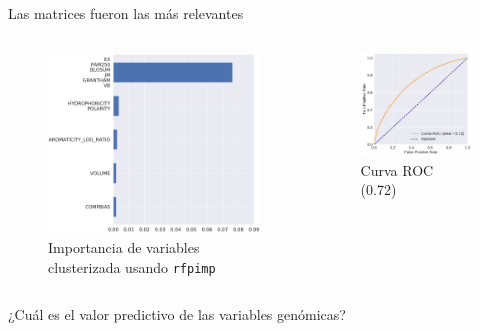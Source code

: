 \documentclass[
  spanish,
  ignorenonframetext,
]{beamer}
\begin{document}
\begin{frame}{Las matrices fueron las más relevantes}
\protect\hypertarget{las-matrices-fueron-las-muxe1s-relevantes}{}

\begin{columns}[T]
\begin{column}{0.48\textwidth}
\begin{figure}
\centering
\includegraphics[width=2.39583in,height=\textheight]{structural_importance_cluster.pdf}
\caption{Importancia de variables clusterizada usando \texttt{rfpimp}}
\end{figure}
\end{column}

\begin{column}{0.48\textwidth}
\begin{figure}
\centering
\includegraphics[width=1.92708in,height=\textheight]{auc_structural.pdf}
\caption{Curva ROC (0.72)}
\end{figure}
\end{column}
\end{columns}

\end{frame}

\begin{frame}{}
\protect\hypertarget{section-2}{}

\begin{center}
\Huge ¿Cuál es el valor predictivo de las variables genómicas?
\end{center}

\end{frame}
\end{document}
